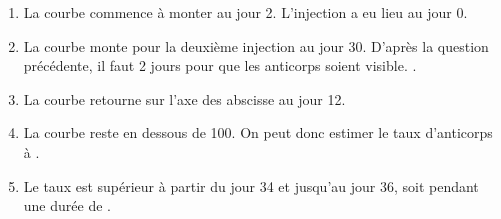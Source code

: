 \begin{enumerate}
    \vspace*{1em}\item La courbe commence à monter au jour 2. L'injection a eu lieu au jour 0. 
    \vspace*{1em}\item La courbe monte pour la deuxième injection au jour 30. D'après la question précédente, il faut 2 jours pour que les anticorps soient visible. .
    \vspace*{1em}\item La courbe retourne sur l'axe des abscisse au jour 12. 
    \vspace*{1em}\item La courbe reste en dessous de 100. On peut donc estimer le taux d'anticorps à .
    \vspace*{1em}\item Le taux est supérieur à partir du jour 34 et jusqu'au jour 36, soit pendant une durée de .
\end{enumerate}

